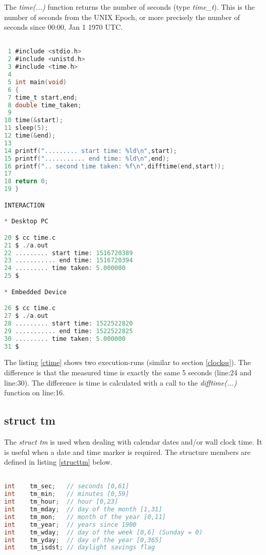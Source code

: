 The \textit{time(...)} function returns the number of seconds (type \textit{time\_t}). This is the number of seconds from the UNIX Epoch, or more precisely the number of seconds since 00:00, Jan 1 1970 UTC.   

\begin{lstlisting}[language=C,showstringspaces=false,caption={File: time.c},captionpos=b,label=ctime]

 1 #include <stdio.h>
 2 #include <unistd.h>
 3 #include <time.h>
 4
 5 int main(void)
 6 {
 7 time_t start,end;
 8 double time_taken;
 9 
10 time(&start);
11 sleep(5);
12 time(&end);
13
14 printf("......... start time: %ld\n",start);
15 printf("........... end time: %ld\n",end);
16 printf(".. second time taken: %f\n",difftime(end,start));
17
18 return 0;
19 }

INTERACTION

* Desktop PC

20 $ cc time.c
21 $ ./a.out
22 ......... start time: 1516720389
23 ........... end time: 1516720394
24 ......... time taken: 5.000000
25 $

* Embedded Device 

26 $ cc time.c
27 $ ./a.out
28 ......... start time: 1522522820
29 ........... end time: 1522522825
30 ......... time taken: 5.000000
31 $ 

\end{lstlisting}

The listing \ref{ctime} shows two execution-runs (similar to section \ref{clockss}). The difference is that the measured time is exactly the same 5 seconds (line:24 and line:30). The difference is time is calculated with a call to the \textit{difftime(...)} function on line:16.

\newpage
\subsection{struct tm} 

The \textit{struct tm} is used when dealing with calendar dates and/or wall clock time. It is useful when a date and time marker is required. The structure members are defined in listing \ref{structtm} below.  

\begin{lstlisting}[language=C,showstringspaces=false,caption={Structure members: struct tm},captionpos=b,label=structtm]

int    tm_sec;   // seconds [0,61]
int    tm_min;   // minutes [0,59]
int    tm_hour;  // hour [0,23]
int    tm_mday;  // day of the month [1,31]
int    tm_mon;   // month of the year [0,11]
int    tm_year;  // years since 1900
int    tm_wday;  // day of the week [0,6] (Sunday = 0)
int    tm_yday;  // day of the year [0,365]
int    tm_isdst; // daylight savings flag

\end{lstlisting}

